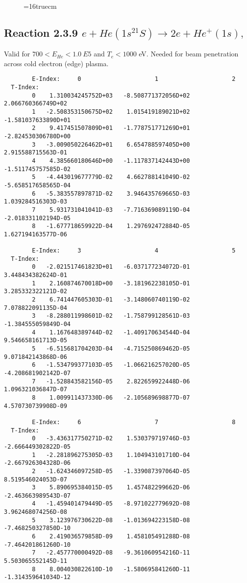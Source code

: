 \documentclass[12pt,dvipdfmx]{article}
\begin{document}
\begin{figure} \label{2.1.5H3}
\epsfxsize=16truecm
\end{figure}

\newpage
\subsection{
Reaction 2.3.9  $e + He(1s^21S) \rightarrow 2e + He^+(1s) ,\ $ }

Valid for $ 700 < E_{He} < 1.0~ E5$ and $T_e  < 1000$ eV.
Needed for beam penetration across cold electron (edge) plasma.

\begin{small}\begin{verbatim}
        E-Index:     0                     1                     2
  T-Index:
        0    1.310034245752D+03   -8.508771372056D+02    2.066760366749D+02
        1   -2.508353150675D+02    1.015419189021D+02   -1.581037633890D+01
        2    9.417451507809D+01   -1.778751771269D+01   -2.824530306780D+00
        3   -3.009050226462D+01    6.654788597405D+00    2.915588715563D-01
        4    4.385660180646D+00   -1.117837142443D+00   -1.511745757585D-02
        5   -4.443019677779D-02    4.662788141049D-02   -5.658517658565D-04
        6   -5.383557897871D-02    3.946435769665D-03    1.039284516303D-03
        7    5.931731041041D-03   -7.716369089119D-04   -2.018331102194D-05
        8   -1.677718659922D-04    1.297692472884D-05    1.627194163577D-06

        E-Index:     3                     4                     5
  T-Index:
        0   -2.021517461823D+01   -6.037177234072D-01    3.448434382624D-01
        1    2.160874670018D+00   -3.181962238105D-01    3.285332322121D-02
        2    6.741447605303D-01   -3.148060740119D-02    7.078822091135D-04
        3   -8.288011998601D-02   -1.758799128561D-03   -1.384555059849D-04
        4    1.167648389744D-02   -1.409170634544D-04    9.546658161713D-05
        5   -6.515681704203D-04   -4.715250869462D-05    9.071842143868D-06
        6   -1.534799377103D-05   -1.066216257020D-05   -4.208681902142D-07
        7   -1.528843582156D-05    2.822659922448D-06    1.096321036847D-07
        8    1.009911437330D-06   -2.105689698877D-07    4.570730739908D-09

        E-Index:     6                     7                     8
  T-Index:
        0   -3.436317750271D-02    1.530379719746D-03   -2.666449302822D-05
        1   -2.281896275305D-03    1.104943101710D-04   -2.667926304328D-06
        2   -1.624346097258D-05   -1.339087397064D-05    8.519546024053D-07
        3    5.890695384015D-05    1.457482299662D-06   -2.463663989543D-07
        4   -1.459401479449D-05   -8.971022779692D-08    3.962468074256D-08
        5    3.123976730622D-08   -1.013694223158D-08   -7.468250327850D-10
        6    2.419036579858D-09    1.458105491288D-08   -7.464201861260D-10
        7   -2.457770000492D-08   -9.361060954216D-11    5.503065552145D-11
        8    8.004030822610D-10   -1.580695841260D-11   -1.314359641034D-12


\end{verbatim}
\end{small}
\end{document}
